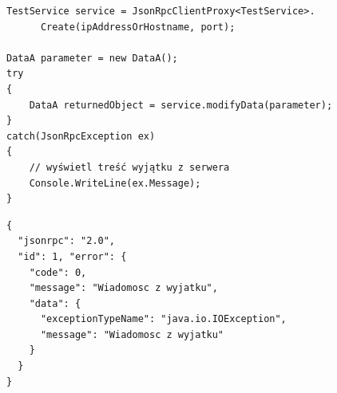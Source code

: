 \begin{lstlisting}[float, frame=single, caption={Tworzenie obiektu proxy do obiektu zdalnego przy użyciu mojej implementacji klienta JSON-RPC pod .NET.}, label=kod:my-json-rpc-clinet]
TestService service = JsonRpcClientProxy<TestService>.
      Create(ipAddressOrHostname, port);

DataA parameter = new DataA();
try
{
    DataA returnedObject = service.modifyData(parameter);
}
catch(JsonRpcException ex)
{
    // wyświetl treść wyjątku z serwera
    Console.WriteLine(ex.Message);
}
\end{lstlisting}

\begin{lstlisting}[float, frame=single, caption={Wiadomość od serwera JSON-RPC zawierająca wyjątek.}, label=kod:json-rpc-exception]
{
  "jsonrpc": "2.0",
  "id": 1, "error": {
    "code": 0,
    "message": "Wiadomosc z wyjatku",
    "data": {
      "exceptionTypeName": "java.io.IOException",
      "message": "Wiadomosc z wyjatku"
    }
  }
}
\end{lstlisting}



%
%
%
